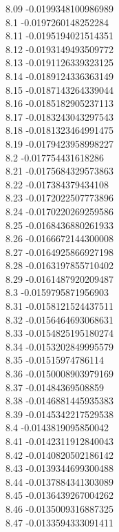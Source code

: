 {8.09	-0.0199348100986989\\
8.1	-0.0197260148252284\\
8.11	-0.0195194021514351\\
8.12	-0.0193149493509772\\
8.13	-0.0191126339323125\\
8.14	-0.0189124336363149\\
8.15	-0.0187143264339044\\
8.16	-0.0185182905237113\\
8.17	-0.0183243043297543\\
8.18	-0.0181323464991475\\
8.19	-0.0179423958998227\\
8.2	-0.017754431618286\\
8.21	-0.0175684329573863\\
8.22	-0.017384379434108\\
8.23	-0.0172022507773896\\
8.24	-0.0170220269259586\\
8.25	-0.0168436880261933\\
8.26	-0.0166672144300008\\
8.27	-0.0164925866927198\\
8.28	-0.0163197855710402\\
8.29	-0.0161487920209487\\
8.3	-0.0159795871956903\\
8.31	-0.0158121524437511\\
8.32	-0.0156464693068631\\
8.33	-0.0154825195180274\\
8.34	-0.0153202849995579\\
8.35	-0.01515974786114\\
8.36	-0.0150008903979169\\
8.37	-0.01484369508859\\
8.38	-0.0146881445935383\\
8.39	-0.0145342217529538\\
8.4	-0.0143819095850042\\
8.41	-0.0142311912840043\\
8.42	-0.0140820502186142\\
8.43	-0.0139344699300488\\
8.44	-0.0137884341303089\\
8.45	-0.0136439267004262\\
8.46	-0.0135009316887325\\
8.47	-0.0133594333091411\\
}

